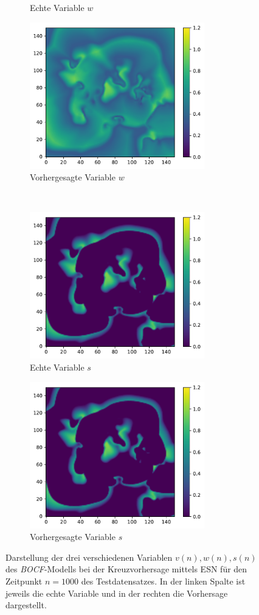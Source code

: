 \begin{figure}[H]
\begin{subfigure}{0.5\textwidth}
		\caption{Echte Variable $w$}
	\end{subfigure}%
	\begin{subfigure}{0.5\textwidth}
		\centering
		\includegraphics[height=2.5in]{figures/results/cross_prediction/bocf_uw_pred.pdf}
		\caption{Vorhergesagte Variable $w$}
	\end{subfigure}%
	\\
	\begin{subfigure}{0.5\textwidth}
		\centering
		\includegraphics[height=2.5in]{figures/results/cross_prediction/bocf_us_orig.pdf}
		\caption{Echte Variable $s$}
	\end{subfigure}%
	\begin{subfigure}{0.5\textwidth}
		\centering
		\includegraphics[height=2.5in]{figures/results/cross_prediction/bocf_us_pred.pdf}
		\caption{Vorhergesagte Variable $s$}
	\end{subfigure}%
	\caption{Darstellung der drei verschiedenen Variablen $v(n), w(n), s(n)$ des \textit{BOCF}-Modells bei der Kreuzvorhersage mittels \textsc{ESN} für den Zeitpunkt $n=1000$ des Testdatensatzes. In der linken Spalte ist jeweils die echte Variable und in der rechten die Vorhersage dargestellt.}
	\label{fig:exp_cross_bocf_results}
\end{figure}

